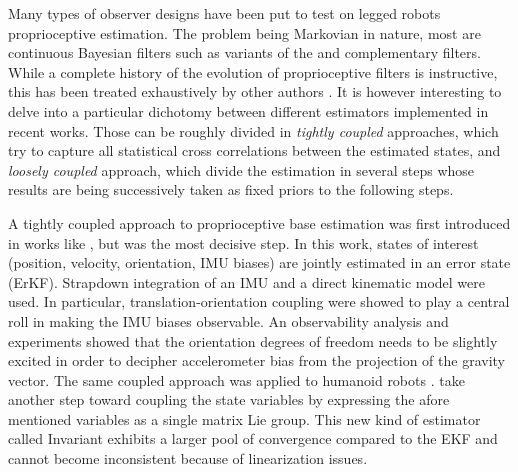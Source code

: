 Many types of observer designs have been put to test on legged robots proprioceptive estimation. The problem being Markovian in nature,
most are continuous Bayesian filters such as variants of the \KalmanF \cite{kalman1960new} and complementary filters. While a complete history of 
the evolution of proprioceptive filters is instructive, this has been treated exhaustively by other authors \cite{bloesch2017state, camurri2017multisensory}. 
It is however interesting to delve into a particular dichotomy between different estimators implemented in recent works. Those can be 
roughly divided in \textit{tightly coupled} approaches, which try to capture all statistical cross correlations between the estimated states,
and \textit{loosely coupled} approach, which divide the estimation in several steps whose results are being successively taken as fixed priors to the 
following steps.

A tightly coupled approach to proprioceptive base estimation was first introduced in works like \cite{chilian2011multisensor}, but \cite{bloesch2013state} was the most decisive step.
In this work, states of interest (position, velocity, orientation, IMU biases) are jointly estimated in an error state \KalmanF (ErKF). Strapdown integration of an IMU and 
a direct kinematic model were used. In particular, translation-orientation coupling were showed to play a central roll in making the IMU biases observable. 
An observability analysis and experiments showed that the orientation degrees of freedom needs to be slightly excited in order to decipher accelerometer bias from the projection of the 
gravity vector. The same coupled approach was applied to humanoid robots \cite{rotella2014state, fallon2014drift}.
\cite{hartley2020contact, lin2021deep} take another step toward coupling the state variables by expressing the afore mentioned variables as a single matrix Lie group.
This new kind of estimator called Invariant \KalmanF \cite{barrau2018invariant} exhibits a larger pool of convergence compared to the EKF and cannot become 
inconsistent because of linearization issues. 


